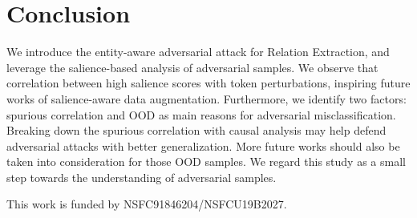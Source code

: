 \documentclass[sigconf]{acmart}
\begin{document}

\section{Conclusion}
We introduce the entity-aware adversarial attack for Relation Extraction, and leverage the salience-based analysis of adversarial samples. We observe that correlation between high salience scores with token perturbations, inspiring future works of salience-aware data augmentation. 
Furthermore, we identify two factors: spurious correlation and OOD as main reasons for adversarial misclassification.
Breaking down the spurious correlation with causal analysis may help defend adversarial attacks with better generalization. 
More future works should also be taken into consideration for those OOD samples. 
We regard this study as a small step towards the understanding of adversarial samples. 

\begin{acks}
This work is funded by NSFC91846204/NSFCU19B2027.
\end{acks}




 




\end{document}
